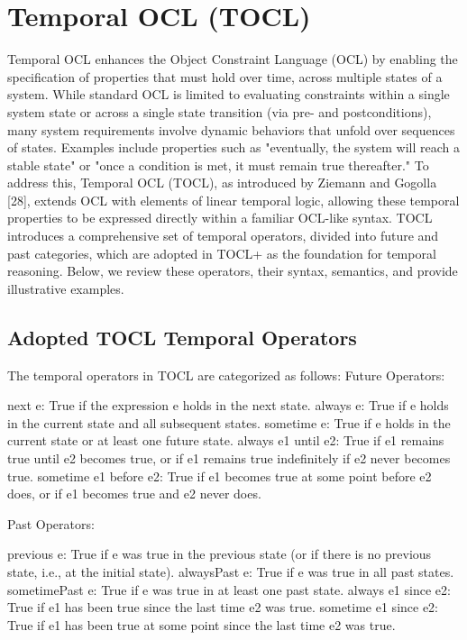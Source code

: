 \section{Temporal OCL (TOCL)}
Temporal OCL enhances the Object Constraint Language (OCL) by enabling the 
specification of properties that must hold over time, across multiple states of 
a system. While standard OCL is limited to evaluating constraints within a 
single system state or across a single state transition (via pre- and postconditions), 
many system requirements involve dynamic behaviors that unfold over sequences of states. 
Examples include properties such as "eventually, the system will reach a stable state" 
or "once a condition is met, it must remain true thereafter." To address this, 
Temporal OCL (TOCL), as introduced by Ziemann and Gogolla [28], extends OCL with 
elements of linear temporal logic, allowing these temporal properties to be expressed 
directly within a familiar OCL-like syntax.
TOCL introduces a comprehensive set of temporal operators, divided into future 
and past categories, which are adopted in TOCL+ as the foundation for temporal 
reasoning. Below, we review these operators, their syntax, semantics, and provide 
illustrative examples.

\subsection{Adopted TOCL Temporal Operators}
The temporal operators in TOCL are categorized as follows:
Future Operators:

next e: True if the expression e holds in the next state.
always e: True if e holds in the current state and all subsequent states.
sometime e: True if e holds in the current state or at least one future state.
always e1 until e2: True if e1 remains true until e2 becomes true, or if e1 remains true indefinitely if e2 never becomes true.
sometime e1 before e2: True if e1 becomes true at some point before e2 does, or if e1 becomes true and e2 never does.

Past Operators:

previous e: True if e was true in the previous state (or if there is no previous state, i.e., at the initial state).
alwaysPast e: True if e was true in all past states.
sometimePast e: True if e was true in at least one past state.
always e1 since e2: True if e1 has been true since the last time e2 was true.
sometime e1 since e2: True if e1 has been true at some point since the last time e2 was true.

